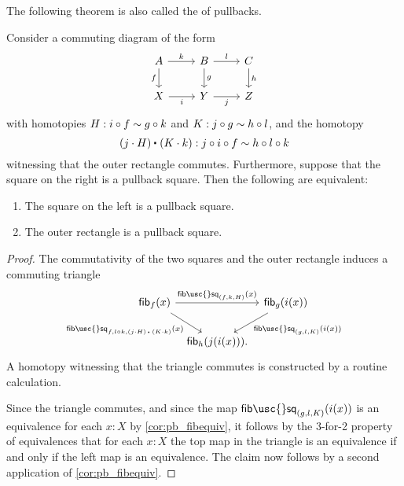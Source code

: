 The following theorem is also called the  of pullbacks.

\begin{thm}\label{thm:pb_pasting}
Consider a commuting diagram of the form
\begin{equation*}
\begin{tikzcd}
A \arrow[r,"k"] \arrow[d,swap,"f"] & B \arrow[r,"l"] \arrow[d,"g"] & C \arrow[d,"h"] \\
X \arrow[r,swap,"i"] & Y \arrow[r,swap,"j"] & Z
\end{tikzcd}
\end{equation*}
with homotopies $H:i\circ f\sim g\circ k$ and $K:j\circ g\sim h\circ l$, and the homotopy
\begin{equation*}
\ct{(j\cdot H)}{(K\cdot k)}:j\circ i\circ f\htpy h\circ l\circ k
\end{equation*}
witnessing that the outer rectangle commutes. Furthermore, suppose that the square on the right is a pullback square. Then the following are equivalent:
\begin{samepage}%
\begin{enumerate}
\item The square on the left is a pullback square.
\item The outer rectangle is a pullback square.
\end{enumerate}%
\end{samepage}%
\end{thm}

\begin{proof}
The commutativity of the two squares and the outer rectangle induces a commuting triangle
\begin{equation*}
\begin{tikzcd}[column sep=tiny]
\fib{f}{x} \arrow[rr,"\mathsf{fib\usc{}sq}_{(f,k,H)}(x)"] \arrow[dr,swap,"\mathsf{fib\usc{}sq}_{f,l\circ k,\ct{(j\cdot H)}{(K\cdot k)}}(x)"] & & \fib{g}{i(x)} \arrow[dl,"\mathsf{fib\usc{}sq}_{(g,l,K)}(i(x))"] \\
& \fib{h}{j(i(x))}.
\end{tikzcd}
\end{equation*}
A homotopy witnessing that the triangle commutes is constructed by a routine calculation.

Since the triangle commutes, and since the map $\mathsf{fib\usc{}sq}_{(g,l,K)}(i(x))$ is an equivalence for each $x:X$ by \cref{cor:pb_fibequiv}, it follows
by the 3-for-2 property of equivalences that for each $x:X$ the top map in the triangle is an equivalence if and only if the left map is an equivalence.
The claim now follows by a second application of \cref{cor:pb_fibequiv}.
\end{proof}

